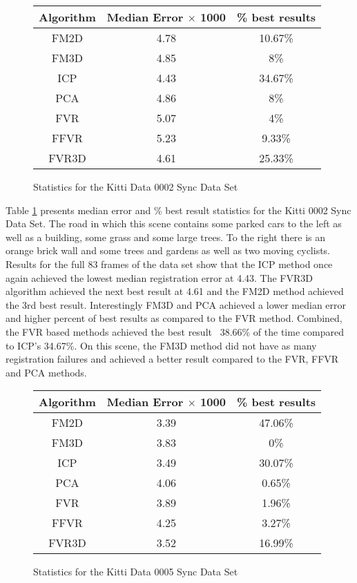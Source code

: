 
\begin{figure}
\centering
\begin{tabular}{ccc}
\hline
\textbf{Algorithm} & \textbf{Median Error $\times$ 1000} & \textbf{\% best results}\\ \hline
FM2D	& 4.78 & 10.67\%\\
FM3D	& 4.85 & 8\%\\
ICP	& 4.43 & 34.67\%\\
PCA	& 4.86 & 8\%\\
FVR	& 5.07 & 4\%\\
FFVR	& 5.23 & 9.33\%\\
FVR3D	& 4.61 & 25.33\%\\
\end{tabular}
\caption{Statistics for the Kitti Data 0002 Sync Data Set}
\label{tab:kittidata0002sync}
\end{figure} 


Table \ref{tab:kittidata0002sync} presents median error and \% best result statistics for the Kitti 0002 Sync Data Set. The road in which this scene contains some parked cars to the left as well as a building, some grass and some large trees. To the right there is an orange brick wall and some trees and gardens as well as two moving cyclists. Results for the full 83 frames of the data set show that the ICP method once again achieved the lowest median registration error at 4.43. The FVR3D algorithm achieved the next best result at 4.61 and the FM2D method achieved the 3rd best result. Interestingly FM3D and PCA achieved a lower median error and higher percent of best results as compared to the FVR method. Combined, the FVR based methods achieved the best result ~38.66\% of the time compared to ICP's 34.67\%. On this scene, the FM3D method did not have as many registration failures and achieved a better result compared to the FVR, FFVR and PCA methods. 




\begin{figure}
\centering
\begin{tabular}{ccc}
\hline
\textbf{Algorithm} & \textbf{Median Error $\times$ 1000} & \textbf{\% best results}\\ \hline
FM2D	& 3.39 & 47.06\%\\
FM3D	& 3.83 & 0\%\\
ICP	& 3.49 & 30.07\%\\
PCA	& 4.06 & 0.65\%\\
FVR	& 3.89 & 1.96\%\\
FFVR	& 4.25 & 3.27\%\\
FVR3D	& 3.52 & 16.99\%\\
\end{tabular}
\caption{Statistics for the Kitti Data 0005 Sync Data Set}
\label{tab:kittidata0005sync}
\end{figure} 

